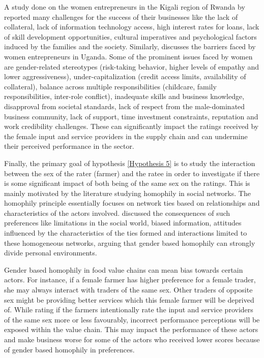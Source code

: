 \documentclass[12pt,english]{article}\usepackage[]{graphicx}\usepackage[]{color}
\begin{document}
\begin{onehalfspace}
A study done on the women entrepreneurs in the Kigali region of Rwanda
by \citet{Nsengimana2017} reported many challenges for the success
of their businesses like the lack of collateral, lack of information
technology access, high interest rates for loans, lack of skill development
opportunities, cultural imperatives and psychological factors induced
by the families and the society. Similarly, \citet{Guma2015} discusses
the barriers faced by women entrepreneurs in Uganda. Some of the prominent
issues faced by women are gender-related stereotypes (risk-taking
behavior, higher levels of empathy and lower aggressiveness), under-capitalization
(credit access limits, availability of collateral), balance across
multiple responsibilities (childcare, family responsibilities, inter-role
conflict), inadequate skills and business knowledge, disapproval from
societal standards, lack of respect from the male-dominated business
community, lack of support, time investment constraints, reputation
and work credibility challenges. These can significantly impact the
ratings received by the female input and service providers in the
supply chain and can undermine their perceived performance in the
sector. 
\end{onehalfspace}

Finally, the primary goal of hypothesis \ref{Hypothesis 5} is to
study the interaction between the sex of the rater (farmer) and the
ratee in order to investigate if there is some significant impact
of both being of the same sex on the ratings. This is mainly motivated
by the literature studying homophily in social networks. The homophily
principle essentially focuses on network ties based on relationships
and characteristics of the actors involved. \citet{mcpherson2001birds}
discussed the consequences of such preferences like limitations in
the social world, biased information, attitudes influenced by the
characteristics of the ties formed and interactions limited to these
homogeneous networks, arguing that gender based homophily can strongly
divide personal environments. 

Gender based homophily in food value chains can mean bias towards
certain actors. For instance, if a female farmer has higher preference
for a female trader, she may always interact with traders of the same
sex. Other traders of opposite sex might be providing better services
which this female farmer will be deprived of. While rating if the
farmers intentionally rate the input and service providers of the
same sex more or less favourably, incorrect performance perceptions
will be exposed within the value chain. This may impact the performance
of these actors and make business worse for some of the actors who
received lower scores because of gender based homophily in preferences. 
\end{document}

